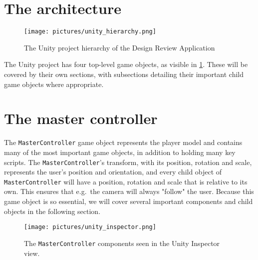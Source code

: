 \section{The architecture}
\begin{figure}%
	\texttt{[image: pictures/unity\_hierarchy.png]}
	\caption[The Unity project hierarchy of the Design Review Application]{The Unity project hierarchy of the Design Review Application}
	\label{fig:unity_hierarchy}
\end{figure} 

The Unity project has four top-level game objects, as visible in \ref{fig:unity_hierarchy}. 
These will be covered by their own sections, with subsections detailing their important child game objects where appropriate.


\section{The master controller}
The \texttt{MasterController} game object represents the player model and contains many of the most important game objects, in addition to
holding many key scripts. The \texttt{MasterController}'s transform, with its position, rotation and scale, represents the user's position and orientation, 
and every child object of \texttt{MasterController} will have a position, rotation and scale that is relative to its own. This ensures
that e.g.~the camera will always "follow" the user. Because this game object is so essential, we will cover several important components and
child objects in the following section.

\begin{figure}%
	\texttt{[image: pictures/unity\_inspector.png]}
	\caption[The \texttt{MasterController} components]{The \texttt{MasterController} components seen in the Unity Inspector view.}
	\label{fig:unity_inspector}
\end{figure} 


